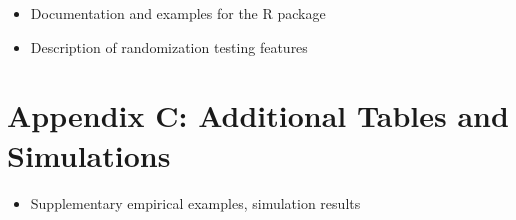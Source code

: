 \documentclass[
  12pt,
]{article}
\providecommand{\tightlist}{%
  \setlength{\itemsep}{0pt}\setlength{\parskip}{0pt}}\usepackage{longtable,booktabs,array}
\theoremstyle{plain}
\theoremstyle{definition}
\theoremstyle{remark}
\begin{document}
\begin{itemize}
\tightlist
\item
  Documentation and examples for the R package\\
\item
  Description of randomization testing features
\end{itemize}

\section{Appendix C: Additional Tables and
Simulations}\label{appendix-c-additional-tables-and-simulations}

\begin{itemize}
\tightlist
\item
  Supplementary empirical examples, simulation results
\end{itemize}
\end{document}
